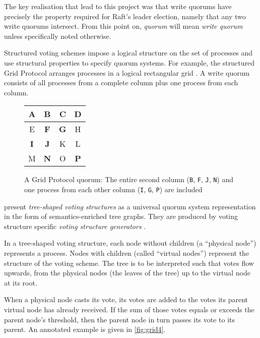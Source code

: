 \documentclass[11pt,chapterprefix=true,toc=bibliography,numbers=noendperiod,
               footnotes=multiple,twoside]{scrreprt}
\newcommand{\voted}[1]{\textbf{\color{black}#1}}
\begin{document}
The key realisation that lead to this project was that write quorums have precisely the property required for Raft's leader election, namely that any two write quorums intersect. From this point on, \emph{quorum} will mean \emph{write quorum} unless specifically noted otherwise.


Structured voting schemes impose a logical structure on the set of processes and use structural properties to specify quorum systems. For example, the structured Grid Protocol arranges processes in a logical rectangular grid \autocite{grid}. A write quorum consists of all processes from a complete column plus one process from each column.

\begin{figure}[h]
    \centering
    {\ttfamily\color{gray}
    \begin{tabular}{c | c | c | c}
        A & \voted{B} & C & D \\
        \hline
        E & \voted{F} & \voted{G} & H \\
        \hline
        \voted{I} & \voted{J} & K & L \\
        \hline
        M & \voted{N} & O & \voted{P} \\
    \end{tabular}
    }
    \caption[Grid protocol quorum table]{A Grid Protocol quorum: The entire second column (\texttt{B}, \texttt{F}, \texttt{J}, \texttt{N}) and one process from each other column (\texttt{I}, \texttt{G}, \texttt{P}) are included}
    \label{fig:grid-quorum}
\end{figure}


\citeauthor{generators} present \emph{tree-shaped voting structures} as a universal quorum system representation in the form of semantics-enriched tree graphs. They are produced by voting structure specific \emph{voting structure generators} \autocite{generators}.

In a tree-shaped voting structure, each node without children (a \enquote{physical node}) represents a process. Nodes with children (called \enquote{virtual nodes}) represent the structure of the voting scheme. The tree is to be interpreted such that votes flow upwards, from the physical nodes (the leaves of the tree) up to the virtual node at its root.

When a physical node casts its vote, its votes are added to the votes its parent virtual node has already received. If the sum of those votes equals or exceeds the parent node's threshold, then the parent node in turn passes its vote to its parent. An annotated example is given in \autoref{fig:grid4}.
\end{document}
